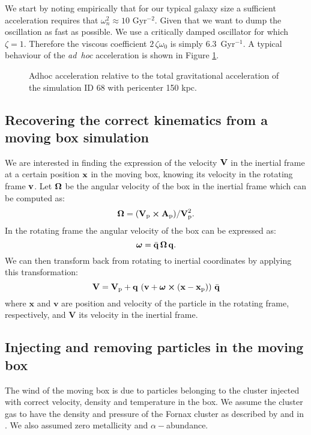 We start by noting empirically that for our typical galaxy size a sufficient acceleration requires that $\omega_n^2\approx 10$ Gyr$^{-2}$.
Given that we want to dump the oscillation as fast as possible. We use a critically damped oscillator  for which $\zeta = 1$. Therefore the viscous coefficient $2\,\zeta\omega_0$ is simply $6.3$~Gyr$^{-1}$.
A typical behaviour of the \emph{ad~hoc} acceleration is shown in Figure \ref{fig:adhoc}.

\begin{figure} %
\centering
\caption{Adhoc acceleration relative to the total gravitational acceleration of the simulation ID 68 with pericenter 150 kpc.}
\label{fig:adhoc}
\end{figure}


\subsection{Recovering the correct kinematics from a moving box simulation}
\label{sec:correct_kinematics}
We are interested in finding the expression of the velocity $\boldsymbol{\mathbf{V}}$ in the inertial frame at a certain position $\boldsymbol{\mathbf{x}}$ in the moving box, knowing its velocity in the rotating frame $\boldsymbol{\mathbf{v}}$.
Let $\boldsymbol{\mathbf{\Omega}}$ be the angular velocity of the box in the inertial frame which can be computed as:
\begin{equation}
 \boldsymbol{\mathbf{\Omega}} = {(\boldsymbol{\mathbf{V}}_{\mathrm p}\cross\boldsymbol{\mathbf{A}}_{\mathrm p})}/{\boldsymbol{\mathbf{V}}_{\mathrm p}^2}.
\end{equation}
In the rotating frame the angular velocity of the box can be expressed as:
\begin{equation}
\boldsymbol{\mathbf{\omega}} = \bar{\mathbf{q}}\, \boldsymbol{\mathbf{\Omega}}\, \mathbf{q}.
\end{equation}
We can then transform back from rotating to inertial coordinates by applying this transformation:
\begin{equation}
\boldsymbol{\mathbf{V}} = \boldsymbol{\mathbf{V}}_{\mathrm p} + \mathbf{q} \, \left(\boldsymbol{\mathbf{v}} + \boldsymbol{\mathbf{\omega}} \cross (\boldsymbol{\mathbf{x}}-\boldsymbol{\mathbf{x}}_{\mathrm p})\right) \,\bar{\mathbf{q}}
\end{equation}
where $\mathbf x$ and $\mathbf v$ are position and velocity of the particle in the rotating frame, respectively, and $\mathbf V$ its velocity in the inertial frame. %

\subsection{Injecting and removing particles in the moving box}
The wind of the moving box is due to particles belonging to the cluster injected with correct velocity, density and temperature in the box.
We assume the cluster gas to have the density and pressure of the Fornax cluster as described by \citet{Paolillo2002} and in . We also assumed zero metallicity and $\alpha-$abundance.

